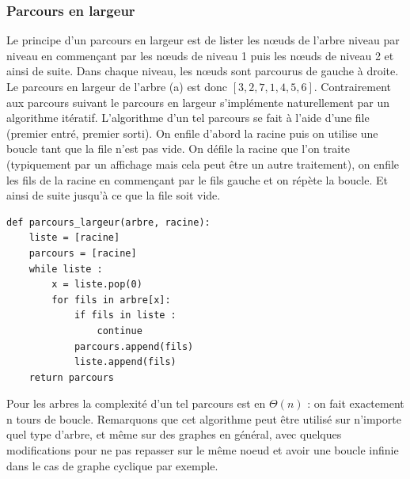 \documentclass{report}
\begin{document}
\subsubsection{Parcours en largeur}
Le principe d'un parcours en largeur est de lister les nœuds de l'arbre niveau par niveau en commençant par les nœuds de niveau 1 puis les nœuds de niveau 2 et ainsi de suite. Dans chaque niveau, les nœuds sont parcourus de gauche à droite.
Le parcours en largeur de l'arbre (a) est donc $[3, 2, 7, 1, 4, 5, 6]$.
Contrairement aux parcours suivant le parcours en largeur s'implémente naturellement par un algorithme itératif.
L'algorithme d'un tel parcours se fait à l'aide d'une file (premier entré, premier sorti). On enfile d'abord la racine puis on utilise une boucle tant que la file n'est pas vide.
On défile la racine que l'on traite (typiquement par un affichage mais cela peut être un autre traitement), on enfile les fils de la racine en commençant par le fils gauche et on répète la boucle. Et ainsi de suite jusqu'à ce que la file soit vide.
\begin{lstlisting}
def parcours_largeur(arbre, racine):
	liste = [racine]
	parcours = [racine]
	while liste :
		x = liste.pop(0)
		for fils in arbre[x]:
			if fils in liste : 
				continue
			parcours.append(fils)
			liste.append(fils)
	return parcours
\end{lstlisting}
Pour les arbres la complexité d'un tel parcours est en $\Theta(n)$ : on fait exactement n tours de boucle. 
Remarquons que cet algorithme peut être utilisé sur n'importe quel type d'arbre, et même sur des graphes en général, avec quelques modifications pour ne pas repasser sur le même noeud et avoir une boucle infinie dans le cas de graphe cyclique par exemple.
\end{document}

